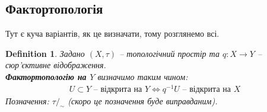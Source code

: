 \documentclass[a4paper, 10pt]{article}
\theoremstyle{theoremdd}
\newtheorem{definition}[theorem]{Definition}
\newtheorem{remark}[theorem]{Remark}
\begin{document}
\iffalse
\begin{remark}
Можна узагальнити означення добутку топології. Маємо $\{(X_\alpha,\tau_\alpha)\}$ -- сім'я топологічних просторів та $X = \displaystyle\prod_{\alpha} X_\alpha$ -- декартів добуток. Якщо визначити клас
\begin{align*}
\mathcal{B} = \left\{ \prod_{\alpha} U_\alpha \mid U_\alpha \in \tau_\alpha, U_\alpha \neq X_\alpha \text{ лише скінченне число разів} \right\},
\end{align*}
то вона утворить базу множини $X$, а тому можна утворити топологію.\\
Позначення: $\displaystyle\prod_\alpha \tau_\alpha \overset{\text{def.}}{=} \tau_{\mathcal{B}}$.
\end{remark}
\fi

\subsection{Фактортопологія}
\noindent
Тут є куча варіантів, як це визначати, тому розглянемо всі.

\begin{definition}
Задано $(X,\tau)$ -- топологічний простір та $q \colon X \to Y$ -- сюр'єктивне відображення.\\
\textbf{Фактортопологію на $Y$} визначимо таким чином:
\begin{align*}
U \subset Y \text{ -- відкрита на } Y \iff q^{-1}U \text{ -- відкрита на } X
\end{align*}
Позначення: $\tau/_\sim$ (скоро це позначення буде виправданим).
\end{definition}
\end{document}
